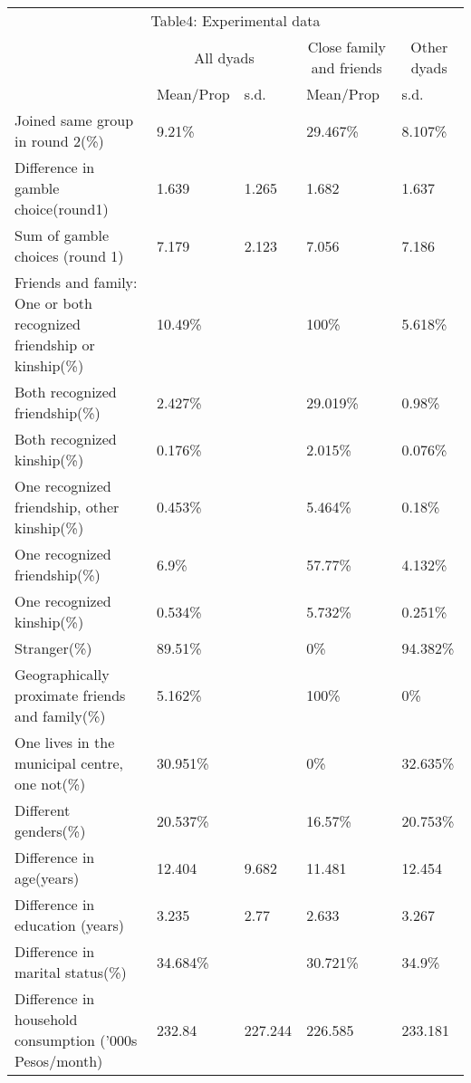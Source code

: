 \documentclass[]{elsarticle} %
\begin{document}
\begin{table}[!h]
\centering\begingroup\fontsize{6}{8}\selectfont

\begin{tabular}{lllll}
\toprule
\multicolumn{5}{c}{Table4: Experimental data} \\
\cmidrule(l{3pt}r{3pt}){1-5}
\multicolumn{1}{c}{ } & \multicolumn{2}{c}{All dyads} & \multicolumn{1}{c}{Close family and friends} & \multicolumn{1}{c}{Other dyads} \\
\cmidrule(l{3pt}r{3pt}){2-3} \cmidrule(l{3pt}r{3pt}){4-4} \cmidrule(l{3pt}r{3pt}){5-5}
  & Mean/Prop & s.d. & Mean/Prop & s.d.\\
\midrule
Joined same group in round 2(\%) & 9.21\% &  & 29.467\% & 8.107\%\\
Difference in gamble choice(round1) & 1.639 & 1.265 & 1.682 & 1.637\\
Sum of gamble choices (round 1) & 7.179 & 2.123 & 7.056 & 7.186\\
Friends and family: One or both recognized friendship or kinship(\%) & 10.49\% &  & 100\% & 5.618\%\\
Both recognized friendship(\%) & 2.427\% &  & 29.019\% & 0.98\%\\
\addlinespace
Both recognized kinship(\%) & 0.176\% &  & 2.015\% & 0.076\%\\
One recognized friendship, other kinship(\%) & 0.453\% &  & 5.464\% & 0.18\%\\
One recognized friendship(\%) & 6.9\% &  & 57.77\% & 4.132\%\\
One recognized kinship(\%) & 0.534\% &  & 5.732\% & 0.251\%\\
Stranger(\%) & 89.51\% &  & 0\% & 94.382\%\\
\addlinespace
Geographically proximate friends and family(\%) & 5.162\% &  & 100\% & 0\%\\
One lives in the municipal centre, one not(\%) & 30.951\% &  & 0\% & 32.635\%\\
Different genders(\%) & 20.537\% &  & 16.57\% & 20.753\%\\
Difference in age(years) & 12.404 & 9.682 & 11.481 & 12.454\\
Difference in education (years) & 3.235 & 2.77 & 2.633 & 3.267\\
\addlinespace
Difference in marital status(\%) & 34.684\% &  & 30.721\% & 34.9\%\\
Difference in household consumption ('000s Pesos/month) & 232.84 & 227.244 & 226.585 & 233.181\\

\end{tabular}
\end{table}
\end{document}
